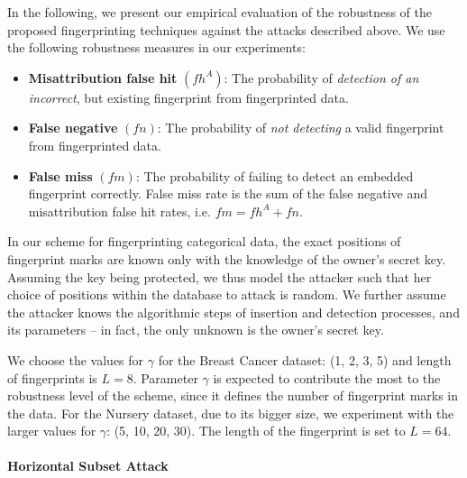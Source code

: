 \documentclass[runningheads]{llncs}
\begin{document}
In the following, we present our empirical evaluation of the robustness of the proposed fingerprinting techniques against the attacks described above. We use the following robustness measures \cite{li2005fingerprinting} in our experiments: 
\begin{itemize}
  \item \textbf{Misattribution false hit} $(fh^A)$: The probability of \textit{detection of an incorrect}, but existing fingerprint from fingerprinted data.
  \item \textbf{False negative} $(fn)$: The probability of \textit{not detecting} a valid fingerprint from fingerprinted data.
  \item \textbf{False miss} $(fm)$: The probability of failing to detect an embedded fingerprint correctly. False miss rate is the sum of the false negative and misattribution false hit rates, i.e. $fm=fh^A+ fn$.
\end{itemize}


In our scheme for fingerprinting categorical data, the exact positions of fingerprint marks are known only with the knowledge of the owner's secret key. 
Assuming the key being protected, we thus model the attacker such that her choice of positions within the database to attack is random. 
We further assume the attacker knows the algorithmic steps of insertion and detection processes, and its parameters -- in fact, the only unknown is the owner's secret key. 

We choose the values for $\gamma$ for the Breast Cancer dataset: (1, 2, 3, 5) and length of fingerprints is $L=8$. Parameter $\gamma$ is expected to contribute the most to the robustness level of the scheme, since it defines the number of fingerprint marks in the data. 
For the Nursery dataset, due to its bigger size, we experiment with the larger values for $\gamma$: (5, 10, 20, 30). The length of the fingerprint is set to $L=64$. 

\paragraph{Horizontal Subset Attack}

\end{document}
